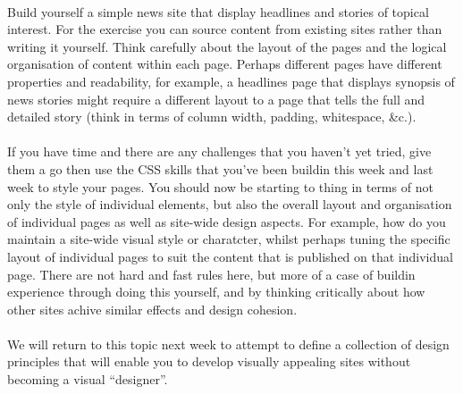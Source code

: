 \documentclass[10pt, a4paper, twosize]{article}
\begin{document}
\paragraph{} Build yourself a simple news site that display headlines and stories of topical interest. For the exercise you can source content from existing sites rather than writing it yourself. Think carefully about the layout of the pages and the logical organisation of content within each page. Perhaps different pages have different properties and readability, for example, a headlines page that displays synopsis of news stories might require a different layout to a page that tells the full and detailed story (think in terms of column width, padding, whitespace, \&c.).

\paragraph{} If you have time and there are any challenges that you haven't yet tried, give them a go then use the CSS skills that you've been buildin this week and last week to style your pages. You should now be starting to thing in terms of not only the style of individual elements, but also the overall layout and organisation of individual pages as well as site-wide design aspects. For example, how do you maintain a site-wide visual style or charatcter, whilst perhaps tuning the specific layout of individual pages to suit the content that is published on that individual page. There are not hard and fast rules here, but more of a case of buildin experience through doing this yourself, and by thinking critically about how other sites achive similar effects and design cohesion.

\paragraph{} We will return to this topic next week to attempt to define a collection of design principles that will enable you to develop visually appealing sites without becoming a visual ``designer''.
\end{document}
